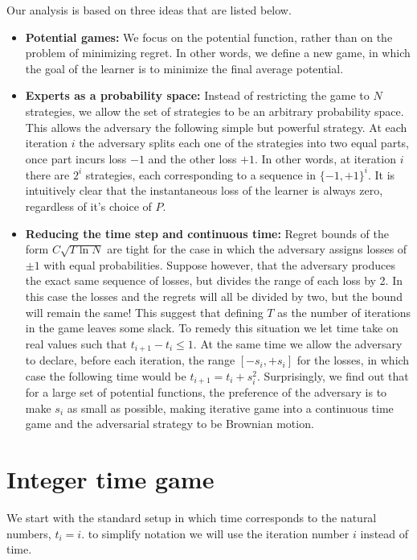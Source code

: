 \documentclass{article}[12pt]
\begin{document}
Our analysis is based on three ideas that are listed below.
\begin{itemize}
    \item {\bf Potential games:} We focus on the potential function, rather than on the problem of minimizing regret. In other words, we define a new game, in which the goal of the learner is to minimize  the final average potential.
    \item {\bf Experts as a probability space:} Instead of restricting the game to $N$ strategies, we allow the set of strategies to be an arbitrary probability space. This allows the adversary the following simple but powerful strategy.  At each iteration $i$ the adversary splits each one of the strategies into two equal parts, once part incurs loss $-1$ and the other loss $+1$. In other words, at iteration $i$ there are $2^i$ strategies, each corresponding to a sequence in $\{-1,+1\}^i$. It is intuitively clear that the instantaneous loss of the learner is always zero, regardless of it's choice of $P$.
    \item {\bf Reducing the time step and continuous time:} Regret bounds of the form $C\sqrt{T \ln N}$ are tight for the case in which the adversary assigns losses of $\pm 1$ with equal probabilities.
    Suppose however, that the adversary produces the exact same sequence of losses, but divides the range of each loss by 2. In this case the losses and the regrets will all be divided by two, but the bound will remain the same! This suggest that defining $T$ as the number of iterations in the game leaves some slack. To remedy this situation we let time take on real values such that $t_{i+1}-t_i \leq 1$. At the same time we 
    allow the adversary to declare, before each iteration, the range $[-s_i,+s_i]$ for the losses, in which case the following time would be 
    $t_{i+1}=t_i +s_i^2$. Surprisingly, we find out that for a large set of potential functions, the preference of the adversary is to make $s_i$ as small as possible, making iterative game into a continuous time game and the adversarial strategy to be Brownian motion.
\end{itemize}

\fi

\section{Integer time game} \label{sec:integer}
We start with the standard setup in which time corresponds to the
natural numbers, $t_i=i$. to simplify notation we will use the
iteration number $i$ instead of time.
\end{document}
